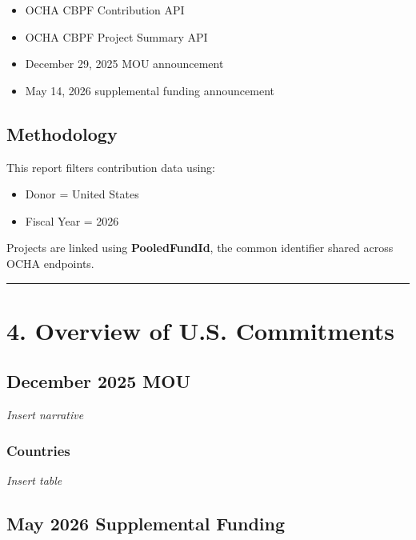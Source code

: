 \documentclass[
  11pt,
  letterpaper,
  DIV=11,
  numbers=noendperiod]{scrartcl}
\providecommand{\tightlist}{%
  \setlength{\itemsep}{0pt}\setlength{\parskip}{0pt}}
\begin{document}
\begin{itemize}
\tightlist
\item
  OCHA CBPF Contribution API
\item
  OCHA CBPF Project Summary API
\item
  December 29, 2025 MOU announcement
\item
  May 14, 2026 supplemental funding announcement
\end{itemize}

\subsection{Methodology}\label{methodology}

This report filters contribution data using:

\begin{itemize}
\tightlist
\item
  Donor = United States
\item
  Fiscal Year = 2026
\end{itemize}

Projects are linked using \textbf{PooledFundId}, the common identifier
shared across OCHA endpoints.

\begin{center}\rule{0.5\linewidth}{0.5pt}\end{center}

\section{4. Overview of U.S.
Commitments}\label{overview-of-u.s.-commitments}

\subsection{December 2025 MOU}\label{december-2025-mou}

\emph{Insert narrative}

\subsubsection{Countries}\label{countries}

\emph{Insert table}

\subsection{May 2026 Supplemental
Funding}\label{may-2026-supplemental-funding}
\end{document}
